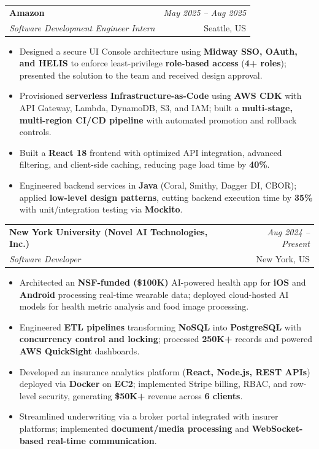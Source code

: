 \documentclass[a4paper,10pt]{article}
\makeatletter
\newcommand{\resumeSubheading}[4]{
\vspace{0.3mm}\item
    \begin{tabular*}{0.98\textwidth}[t]{l@{\extracolsep{\fill}}r}
        \textbf{#1} & \textit{\footnotesize{#4}} \\
        \textit{\footnotesize{#3}} & \footnotesize{#2}\\
    \end{tabular*}\vspace{-2mm}
}
\newcommand{\resumeItemListStart}{\begin{itemize}[leftmargin=*, labelsep=1mm, itemsep=0pt]}
\newcommand{\resumeItemListEnd}{\end{itemize}\vspace{-2mm}}
\makeatother
\begin{document}
\resumeSubheading
{Amazon}{Seattle, US}
{Software Development Engineer Intern}{May 2025 -- Aug 2025}
\resumeItemListStart
\item \footnotesize{Designed a secure UI Console architecture using \textbf{Midway SSO, OAuth, and HELIS} to enforce least-privilege \textbf{role-based access} (\textbf{4+ roles}); presented the solution to the team and received design approval.}
\item \footnotesize{Provisioned \textbf{serverless Infrastructure-as-Code} using \textbf{AWS CDK} with API Gateway, Lambda, DynamoDB, S3, and IAM; built a \textbf{multi-stage, multi-region CI/CD pipeline} with automated promotion and rollback controls.}
\item \footnotesize{Built a \textbf{React 18} frontend with optimized API integration, advanced filtering, and client-side caching, reducing page load time by \textbf{40\%}.}
\item \footnotesize{Engineered backend services in \textbf{Java} (Coral, Smithy, Dagger DI, CBOR); applied \textbf{low-level design patterns}, cutting backend execution time by \textbf{35\%} with unit/integration testing via \textbf{Mockito}.}
\resumeItemListEnd

\resumeSubheading
{New York University (Novel AI Technologies, Inc.)}{New York, US}
{Software Developer}{Aug 2024 -- Present}
\resumeItemListStart
\item \footnotesize{Architected an \textbf{NSF-funded (\$100K)} AI-powered health app for \textbf{iOS} and \textbf{Android} processing real-time wearable data; deployed cloud-hosted AI models for health metric analysis and food image processing.}
\item \footnotesize{Engineered \textbf{ETL pipelines} transforming \textbf{NoSQL} into \textbf{PostgreSQL} with \textbf{concurrency control and locking}; processed \textbf{250K+} records and powered \textbf{AWS QuickSight} dashboards.}
\item \footnotesize{Developed an insurance analytics platform (\textbf{React, Node.js, REST APIs}) deployed via \textbf{Docker} on \textbf{EC2}; implemented Stripe billing, RBAC, and row-level security, generating \textbf{\$50K+} revenue across \textbf{6 clients}.}
\item \footnotesize{Streamlined underwriting via a broker portal integrated with insurer platforms; implemented \textbf{document/media processing} and \textbf{WebSocket-based real-time communication}.}
\resumeItemListEnd
\end{document}
